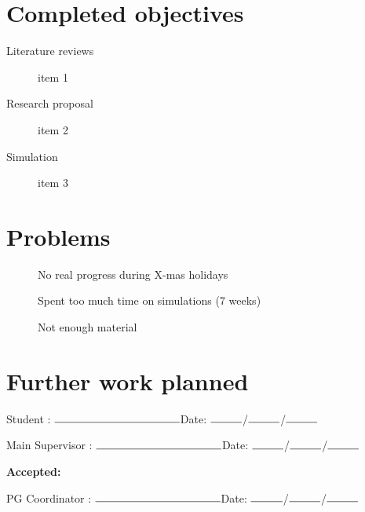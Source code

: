 \documentclass[12pt, twoside]{article}
\begin{document}
\section*{Completed objectives}
\begin{description}
	\item[Literature reviews] item 1
	\item[Research proposal] item 2
	\item[Simulation] item 3
\end{description}

\section*{Problems}
\begin{description}
	\item[] No real progress during X-mas holidays
	\item[] Spent too much time on simulations (7 weeks) 
	\item[] Not enough material 
\end{description}

\section*{Further work planned}
\begin{description}
	\item
\end{description}


\begin{flushright}
	Student : $\rule{4cm}{0.15mm}$\hspace{2cm}Date: $\rule{1cm}{0.15mm}$/$\rule{1cm}{0.15mm}$/$\rule{1cm}{0.15mm}$
	\bigbreak
	
	Main Supervisor : $\rule{4cm}{0.15mm}$\hspace{2cm}Date: $\rule{1cm}{0.15mm}$/$\rule{1cm}{0.15mm}$/$\rule{1cm}{0.15mm}$
	\bigbreak
	
	\textbf{Accepted: \hspace{13cm}}
	
	\bigbreak
	PG Coordinator : $\rule{4cm}{0.15mm}$\hspace{2cm}Date: $\rule{1cm}{0.15mm}$/$\rule{1cm}{0.15mm}$/$\rule{1cm}{0.15mm}$
	
\end{flushright}
\end{document}
